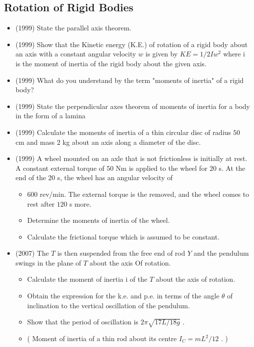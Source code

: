 \documentclass{article}
\begin{document}
\subsection{Rotation of Rigid Bodies}
\begin{itemize}
\item (1999)  State the parallel axis theorem.
\item (1999)  Show that the Kinetic energy (K.E.) of rotation of a rigid body about an axis with a constant angular velocity $ w$ is given by $ KE =1/2Iw^{2}$ where i is the moment of inertia of the rigid body about the given axis.
\item (1999)  What do you understand by the term "moments of inertia" of a rigid body?
\item (1999)  State the perpendicular axes theorem of moments of inertia for a body in the form of a lamina
\item (1999)  Calculate the moments of inertia of a thin circular disc of radius $ 50$ cm and mass $ 2$ kg about an axis along a diameter of the disc.
\item (1999)  A wheel mounted on an axle that is not frictionless is initially at rest. A constant external torque of $ 50$ Nm is applied to the wheel for $ 20$ s. At the end of the $ 20$ s, the wheel has an angular velocity of\begin{itemize}
\item $ 600$ rev/min. The external torque is the removed, and the wheel comes to rest after $ 120$ s more.
\item Determine the moments of inertia of the wheel.
\item Calculate the frictional torque which is assumed to be constant. 
\end{itemize}
\item (2007)  The $ T$ is then suspended from the free end of rod $ Y$ and the pendulum swings in the plane of $ T$ about the axis Of rotation.\begin{itemize}
\item Calculate the moment of inertia i of the $ T$ about the axis of rotation. 
\item Obtain the expression for the k.e. and p.e. in terms of the angle $ \theta $ of inclination to the vertical oscillation of the pendulum. 
\item Show that the period of oscillation is $ 2\pi\sqrt{17L/18g}$ . 
\item ( Moment of inertia of a thin rod about its centre $ I_{C}=mL^{2}/12$ . )
\end{itemize}

\end{itemize}
\end{document}
